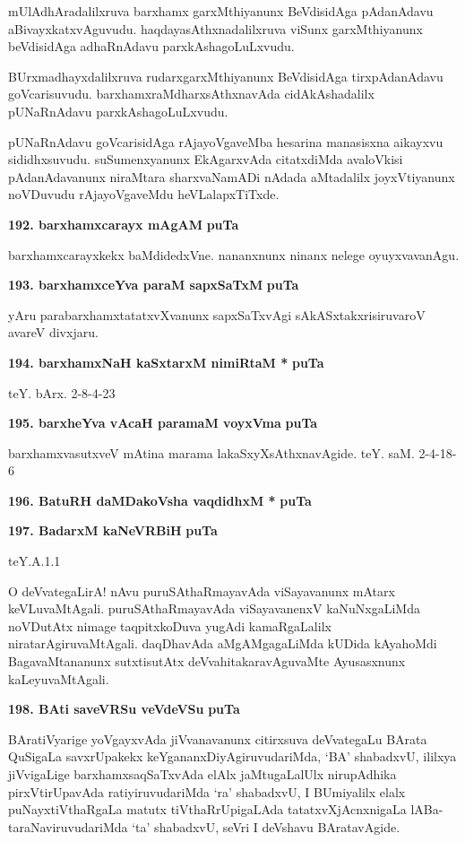 mUlAdhAradalilxruva barxhamx garxMthiyanunx BeVdisidAga pAdanAdavu aBivayxkatx\-vAguvudu. haqdaya\-sAthxna\-dalilxruva viSunx garxMthiyanunx beVdisidAga adhaRnAdavu parxkAshagoLuLxvudu.

BUrxmadhayxdalilxruva rudarxgarxMthiyanunx BeVdisidAga tirxpAdanAdavu goVcarisu\-vudu. barxhamxraMdharxsAthxna\-vAda cidAkAshadalilx pUNaRnAdavu parxkAshagoLuLxvudu.

pUNaRnAdavu goVcarisidAga rAjayoVgaveMba hesarina manasisxna aikayxvu sididhxsuvudu. suSu\-menx\-yanunx EkAgarxvAda citatxdiMda avaloVkisi pAdanAdavanunx niraMtara sharxvaNamADi nAdada aMtadalilx joyxVtiyanunx noVDuvudu rAjayoVga\-veMdu heVLalapxTiTxde.

\medskip
\noindent
\textbf{192. barxhamxcarayx mAgAM} \hfill{\bf puTa \pageref{78}}

\smallskip
barxhamxcarayxkekx baMdidedxVne. nananxnunx ninanx nelege oyuyxvavanAgu.

\medskip
\noindent
\textbf{193. barxhamxceYva paraM sapxSaTxM} \hfill{\bf puTa \pageref{92}}

\smallskip
yAru parabarxhamxtatatxvXvanunx sapxSaTxvAgi sAkASxtakxrisiruvaroV avareV divxjaru.

\medskip
\noindent
\textbf{194. barxhamxNaH kaSxtarxM nimiRtaM *} \hfill{\bf puTa \pageref{85}}

\hfill{teY. bArx. 2-8-4-23}

\medskip
\noindent
\textbf{195. barxheYva vAcaH paramaM voyxVma} \hfill{\bf puTa \pageref{183}}

\smallskip
barxhamxvasutxveV mAtina marama lakaSxyXsAthxnavAgide. \hfill{teY. saM. 2-4-18-6}

\medskip
\noindent
\textbf{196. BatuRH daMDakoVsha vaqdidhxM *} \hfill{\bf puTa \pageref{95}}

\medskip
\noindent
\textbf{197. BadarxM kaNeVRBiH} \hfill{\bf puTa \pageref{63}}

\hfill{teY.A.1.1}

\eject

O deVvategaLirA! nAvu puruSAthaRmayavAda viSayavanunx mAtarx keVLuvaMtAgali. puruSAthaR\-mayavAda viSayavanenxV kaNuNxgaLiMda noVDutAtx nimage taqpitxkoDuva yugAdi kamaRgaLalilx nirata\-rAgiruvaMtAgali. daqDhavAda aMgAMgagaLiMda kUDida kAyahoMdi BagavaMtananunx sutxtisutAtx deVva\-hitakaravAguvaMte Ayusasxnunx kaLeyuvaMtAgali.

\medskip
\noindent
\textbf{198. BAti saveVRSu veVdeVSu} \hfill{\bf puTa \pageref{20}}

\smallskip
BAratiVyarige yoVgayxvAda jiVvanavanunx citirxsuva deVvategaLu BArata QuSi\-gaLa savxrUpakekx keYgananx\-DiyAgiruvudariMda, `BA' shabadxvU, ililxya jiVvigaLige barxhamx\-saqSaTxvAda elAlx jaMtugaLalUlx nirupAdhika pirxVtirUpavAda ratiyiruvudariMda `ra' shabadxvU, I BUmiyalilx elalx puNayxtiVthaRgaLa matutx tiVthaR\-rUpi\-gaLAda tatatxvXjAcnxnigaLa lABa-taraNaviruvudariMda `ta' shabadxvU, seVri I deVshavu BAratavAgide.

